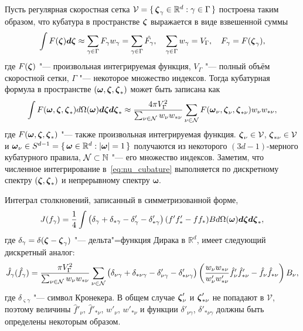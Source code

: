 Пусть регулярная скоростная сетка \(\mathcal{V} = \{\,{{\boldsymbol{\zeta}}_\gamma\in\mathbb{R}^d}:{\gamma\in\Gamma}\,\}\)
построена таким образом, что кубатура в пространстве \({\boldsymbol{\zeta}}\) выражается в виде взвешенной суммы
\begin{equation}\label{eq:bzeta_cubature}
    \int F({\boldsymbol{\zeta}}) \boldsymbol{d\zeta} \approx \sum_{\gamma\in\Gamma} F_\gamma w_\gamma =
        \sum_{\gamma\in\Gamma} \hat{F_\gamma}, \quad
    \sum_{\gamma\in\Gamma} w_\gamma = V_\Gamma, \quad
    F_\gamma = F({\boldsymbol{\zeta}}_\gamma),
\end{equation}
где \(F({\boldsymbol{\zeta}})\) "--- произвольная интегрируемая функция,
\(V_\Gamma\) "--- полный объём скоростной сетки, \(\Gamma\) "--- некоторое множество индексов.
Тогда кубатурная формула в пространстве \((\boldsymbol{\omega},{\boldsymbol{\zeta}},{\boldsymbol{\zeta}}_*)\)
может быть записана как
\begin{equation}\label{eq:nu_cubature}
    \int F(\boldsymbol{\omega},{\boldsymbol{\zeta}},{\boldsymbol{\zeta}}_*) d\Omega(\boldsymbol{\omega})\boldsymbol{d\zeta}\boldsymbol{d\zeta}_* \approx
        \frac{4\pi V_\Gamma^2}{ \sum_{\nu\in\mathcal{N}} w_{\nu}w_{*\nu} }
        \sum_{\nu\in\mathcal{N}} F(\boldsymbol{\omega}_\nu,{\boldsymbol{\zeta}}_{\nu},{\boldsymbol{\zeta}}_{*\nu}) w_{\nu}w_{*\nu},
\end{equation}
где \(F(\boldsymbol{\omega},{\boldsymbol{\zeta}},{\boldsymbol{\zeta}}_*)\) "--- также произвольная интегрируемая функция.
\({\boldsymbol{\zeta}}_{\nu}\in\mathcal{V}\), \({\boldsymbol{\zeta}}_{*\nu}\in\mathcal{V}\)
и \(\boldsymbol{\omega}_\nu\in S^{d-1} = \{\,{\boldsymbol{\omega}\in\mathbb{R}^d}:{|\boldsymbol{\omega}| = 1}\,\}\)
получаются из некоторого \((3d-1)\)-мерного кубатурного правила,
\(\mathcal{N}\subset\mathbb{N}\) "--- его множество индексов.
Заметим, что численное интегрирование в~\eqref{eq:nu_cubature} выполняется по
дискретному спектру \(({\boldsymbol{\zeta}},{\boldsymbol{\zeta}}_*)\) и непрерывному спектру \(\boldsymbol{\omega}\).

Интеграл столкновений, записанный в симметризованной форме,
\begin{equation}\label{eq:symm_ci}
    J(f_\gamma) = \frac14\int \left(
        \delta_\gamma + \delta_{*\gamma} - \delta'_\gamma - \delta'_{*\gamma}
    \right) (f'f'_* - ff_*)B d\Omega(\boldsymbol{\omega}) \boldsymbol{d\zeta}\boldsymbol{d\zeta}_*,
\end{equation}
где \(\delta_\gamma = \delta({\boldsymbol{\zeta}}-{\boldsymbol{\zeta}}_\gamma)\) "--- дельта"=функция Дирака в \(\mathbb{R}^d\),
имеет следующий дискретный аналог:
\begin{equation}\label{eq:discrete_symm_ci}
    \hat{J}_\gamma(\hat{f}_\gamma) =
        \frac{\pi V_\Gamma^2}{\sum_{\nu\in\mathcal{N}} w_{\nu}w_{*\nu}}
        \sum_{\nu\in\mathcal{N}} \left(
            \delta_{\nu\gamma} + \delta_{*\nu\gamma}
            - \delta'_{\nu\gamma} - \delta'_{*\nu\gamma}
        \right)\left(
            \frac{w_{\nu}w_{*\nu}}{w'_{\nu}w'_{*\nu}}
            \hat{f}'_{\nu}\hat{f}'_{*\nu} - \hat{f}_{\nu}\hat{f}_{*\nu}
        \right)B_\nu,
\end{equation}
где \(\delta_{\varsigma\gamma}\) "--- символ Кронекера.
В общем случае \({\boldsymbol{\zeta}}'_{\nu}\) и \({\boldsymbol{\zeta}}'_{*\nu}\) не попадают в \(\mathcal{V}\),
поэтому величины \(\hat{f}'_{\nu}\), \(\hat{f}'_{*\nu}\), \(w'_{\nu}\), \(w'_{*\nu}\)
и функции \(\delta'_{\nu\gamma}\), \(\delta'_{*\nu\gamma}\) должны быть определены некоторым образом.

